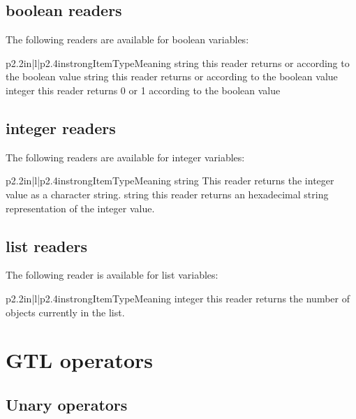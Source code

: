 \subsection{boolean readers}

The following readers are available for boolean variables:

\begin{longtableiii}{p{2.2in}|l|p{2.4in}}{strong}{Item}{Type}{Meaning}
  {string}
  {this reader returns  or  according to the boolean value}
  {string}
  {this reader returns  or  according to the boolean value}
  {integer}
  {this reader returns 0 or 1 according to the boolean value}
\end{longtableiii}

\subsection{integer readers}

The following readers are available for integer variables:

\begin{longtableiii}{p{2.2in}|l|p{2.4in}}{strong}{Item}{Type}{Meaning}
  {string}
  {This reader returns the integer value as a character string.}
  {string}
  {this reader returns an hexadecimal string representation of the integer value.}
\end{longtableiii}

\subsection{list readers}

The following reader is available for list variables:

\begin{longtableiii}{p{2.2in}|l|p{2.4in}}{strong}{Item}{Type}{Meaning}
  {integer}
  {this reader returns the number of objects currently in the list.}
\end{longtableiii}

\section{GTL operators}

\subsection{Unary operators}

